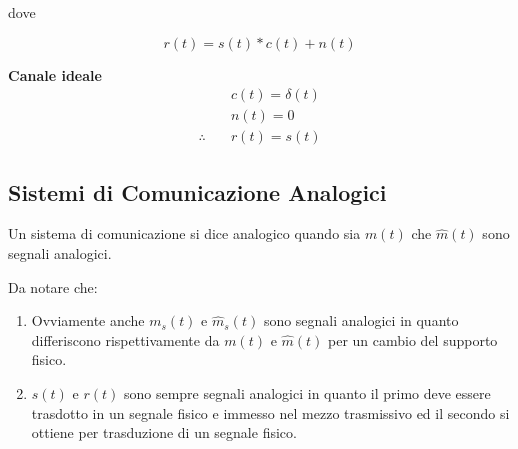 dove

\[
    r(t) = s(t) \ast c(t) + n(t)
\]

\textbf{Canale ideale}
\begin{align*}
                     & c(t) = \delta(t) \\
                     & n(t) = 0         \\
    \therefore \quad & r(t) = s(t)
\end{align*}


\subsection*{Sistemi di Comunicazione Analogici}
Un sistema di comunicazione si dice analogico quando sia \( m(t) \) che \( \hat{m}(t) \) sono segnali analogici.

Da notare che:
\begin{enumerate}
    \item Ovviamente anche \( m_s(t) \) e \( \hat{m}_s(t) \) sono segnali analogici in quanto differiscono rispettivamente da \( m(t) \) e \( \hat{m}(t) \) per un cambio del supporto fisico.
    \item \( s(t) \) e \( r(t) \) sono sempre segnali analogici in quanto il primo deve essere trasdotto in un segnale fisico e immesso nel mezzo trasmissivo ed il secondo si ottiene per trasduzione di un segnale fisico.
\end{enumerate}
